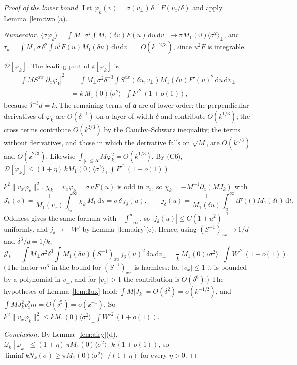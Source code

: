 \documentclass[11pt]{article}
\newcommand{\dd}{\mathrm{d}}
\newcommand{\cD}{\mathcal{D}}
\newcommand{\cQ}{\mathcal{Q}}
\newcommand{\cJ}{\mathcal{J}}
\newcommand{\fa}{\mathfrak{a}}
\newcommand{\avg}[1]{\langle #1\rangle}
\newcommand{\nstar}[1]{\|#1\|_*}
\theoremstyle{remark}
\begin{document}
\begin{proof}[Proof of the lower bound]
Let $\varphi_k(v)=\sigma(v_\perp)\,\delta^{-1}F(v_x/\delta)$ and apply
Lemma~\ref{lem:two}(a).

\emph{Numerator.}
$\avg{\sigma\varphi_k}=\int M_\perp\sigma^2\int M_1(\delta u)F(u)\,\dd u\,\dd v_\perp
\to\pi M_1(0)\avg{\sigma^2}_\perp$, and
$\tau_k=\int M_\perp\sigma\,\delta^2\int u^2F(u)M_1(\delta u)\,\dd u\,\dd v_\perp
=O(k^{-2/3})$, since $u^2F$ is integrable.

\emph{$\cD[\varphi_k]$.} The leading part of $\fa[\varphi_k]$ is
\begin{align*}
  \int MS^{xx}|\partial_x\varphi_k|^2
  &=\int M_\perp\sigma^2\delta^{-3}\int S^{xx}(\delta u,v_\perp)M_1(\delta u)
   F'(u)^2\,\dd u\,\dd v_\perp \\
  &=k\,M_1(0)\avg{\sigma^2}_\perp\!\int F'^2\,(1+o(1)),
\end{align*}
because $\delta^{-3}d=k$. The remaining terms of $\fa$ are of lower order:
the perpendicular derivatives of $\varphi_k$ are $O(\delta^{-1})$ on a layer
of width $\delta$ and contribute $O(k^{1/3})$; the cross terms contribute
$O(k^{2/3})$ by the Cauchy--Schwarz inequality; the terms without
derivatives, and those in which the derivative falls on $\sqrt M$, are
$O(k^{1/3})$ and $O(k^{2/3})$. Likewise $\int_{|v|\le R}M\varphi_k^2=O(k^{1/3})$.
By (C6), $\cD[\varphi_k]\le(1+\eta)\,kM_1(0)\avg{\sigma^2}_\perp\int F'^2\,(1+o(1))$.

\emph{$k^2\nstar{v_x\varphi_k}^2$.} $\chi_k=v_x\varphi_k=\sigma\,uF(u)$ is odd
in $v_x$, so $\chi_k=-M^{-1}\partial_x(MJ_k)$ with
\[
  J_k(v)=\frac{1}{M_1(v_x)}\int_{v_x}^\infty\chi_k\,M_1\,\dd s
        =\sigma\,\delta\,j_\delta(u),\qquad
  j_\delta(u)=\frac{1}{M_1(\delta u)}\int_u^\infty tF(t)M_1(\delta t)\,\dd t .
\]
Oddness gives the same formula with $-\int_{-\infty}^{u}$, so
$|j_\delta(u)|\le C(1+u^2)^{-1}$ uniformly, and $j_\delta\to-W'$ by
Lemma~\ref{lem:airy}(c). Hence, using $(S^{-1})_{xx}\to1/d$ and
$\delta^3/d=1/k$,
\[
  \cJ_k=\int M_\perp\sigma^2\delta^3\!\int M_1(\delta u)(S^{-1})_{xx}\,
  j_\delta(u)^2\,\dd u\,\dd v_\perp
  =\frac1k\,M_1(0)\avg{\sigma^2}_\perp\!\int W'^2\,(1+o(1)).
\]
(The factor $m^3$ in the bound for $(S^{-1})_{xx}$ is harmless: for
$|v_x|\le1$ it is bounded by a polynomial in $v_\perp$, and for $|v_x|>1$ the
contribution is $O(\delta^6)$.) The hypotheses of Lemma~\ref{lem:flux} hold:
$\int M|J_k|=O(\delta^2)=o(k^{-1/2})$, and
$\int MJ_k^2v_x^2m=O(\delta^5)=o(k^{-1})$. So
$k^2\nstar{v_x\varphi_k}^2\le kM_1(0)\avg{\sigma^2}_\perp\int W'^2\,(1+o(1))$.

\emph{Conclusion.} By Lemma~\ref{lem:airy}(d),
$\cQ_k[\varphi_k]\le(1+\eta)\,\pi M_1(0)\avg{\sigma^2}_\perp k\,(1+o(1))$, so
$\liminf kN_k(\sigma)\ge\pi M_1(0)\avg{\sigma^2}_\perp/(1+\eta)$ for every
$\eta>0$.
\end{proof}
\end{document}
